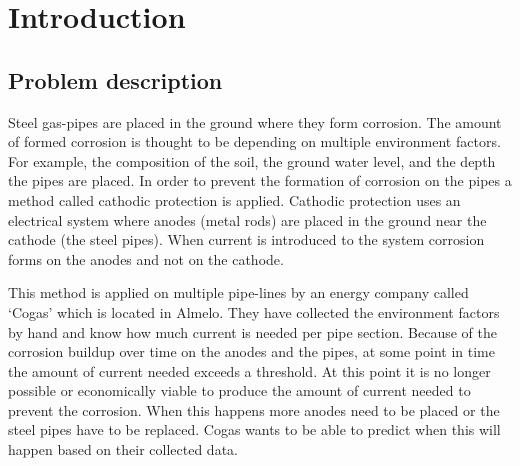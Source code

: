 
\chapter{Introduction}\label{ch:introduction}

\section{Problem description}









Steel gas-pipes are placed in the ground where they form corrosion. The amount of formed corrosion is thought to be depending on multiple environment factors. For example, the composition of the soil, the ground water level, and the depth the pipes are placed. In order to prevent the formation of corrosion on the pipes a method called cathodic protection is applied. Cathodic protection uses an electrical system where anodes (metal rods) are placed in the ground near the cathode (the steel pipes). When current is introduced to the system corrosion forms on the anodes and not on the cathode. 

This method is applied on multiple pipe-lines by an energy company called `Cogas' which is located in Almelo. They have collected the environment factors by hand and know how much current is needed per pipe section. Because of the corrosion buildup over time on the anodes and the pipes, at some point in time the amount of current needed exceeds a threshold. At this point it is no longer possible or economically viable to produce the amount of current needed to prevent the corrosion. When this happens more anodes need to be placed or the steel pipes have to be replaced. Cogas wants to be able to predict when this will happen based on their collected data.

